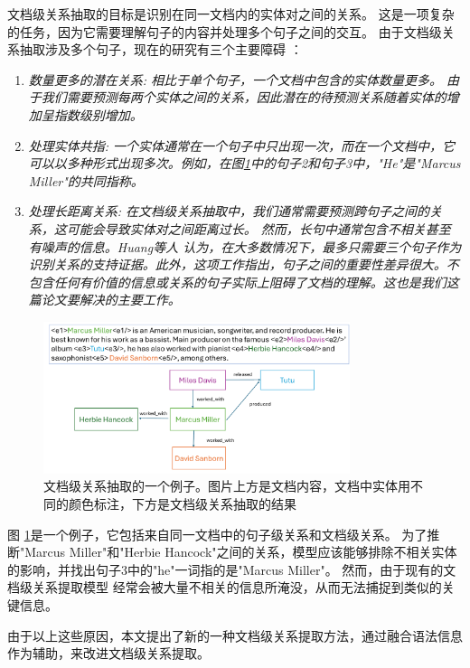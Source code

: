 \documentclass[bachelor]{thesis-uestc}
\begin{document}
文档级关系抽取的目标是识别在同一文档内的实体对之间的关系。
这是一项复杂的任务，因为它需要理解句子的内容并处理多个句子之间的交互。
由于文档级关系抽取涉及多个句子，现在的研究有三个主要障碍 \cite{9098945}：
\begin{enumerate}
    \item \em{数量更多的潜在关系}: 相比于单个句子，一个文档中包含的实体数量更多。
    由于我们需要预测每两个实体之间的关系，因此潜在的待预测关系随着实体的增加呈指数级别增加。
    \item \em{处理实体共指}: 一个实体通常在一个句子中只出现一次，而在一个文档中，它可以以多种形式出现多次。例如，在图\ref{fig_example}中的句子2和句子3中，"He"是"Marcus Miller"的共同指称。
    \item \em{处理长距离关系}: 在文档级关系抽取中，我们通常需要预测跨句子之间的关系，这可能会导致实体对之间距离过长。
    然而，长句中通常包含不相关甚至有噪声的信息。Huang等人\cite{huang-etal-2021-three} 认为，在大多数情况下，最多只需要三个句子作为识别关系的支持证据。此外，这项工作指出，句子之间的重要性差异很大。不包含任何有价值的信息或关系的句子实际上阻碍了文档的理解。这也是我们这篇论文要解决的主要工作。
\end{enumerate}
\begin{figure}[h]
    \centering
    \includegraphics[width=0.8\textwidth]{misc/fig_example.pdf}
    \caption{文档级关系抽取的一个例子。图片上方是文档内容，文档中实体用不同的颜色标注，下方是文档级关系抽取的结果}
    \label{fig_example}
\end{figure}

图 \ref{fig_example}是一个例子，它包括来自同一文档中的句子级关系和文档级关系。
为了推断"Marcus Miller"和"Herbie Hancock"之间的关系，模型应该能够排除不相关实体的影响，并找出句子3中的"he"一词指的是"Marcus Miller"。
然而，由于现有的文档级关系提取模型 \cite{bai-etal-2021-syntax} 经常会被大量不相关的信息所淹没，从而无法捕捉到类似的关键信息。 \par

由于以上这些原因，本文提出了新的一种文档级关系提取方法，通过融合语法信息作为辅助，来改进文档级关系提取。\par
\end{document}
